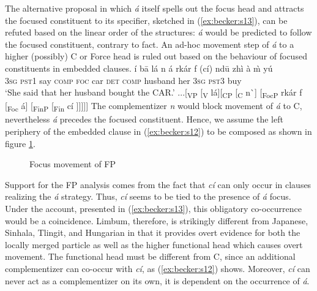 \documentclass[output=paper,
modfonts
]{langscibook}
\begin{document}
The alternative proposal in which {\em \'a} itself spells out the focus head and attracts the focused constituent to its specifier, sketched in (\ref{ex:becker:s13}), can be refuted based on the linear order of the structures: {\em \'a} would be predicted to follow the focused constituent, contrary to fact. An ad-hoc movement step of {\em \'a} to a higher (possibly) C or Force head is ruled out based on the behaviour of focused constituents in embedded clauses.
\ea
\ea \label{ex:becker:s12}
\gll \'i b\=a l\'a n \'a rk\'ar f (c\'i) {nd\=u} {zh\`i} \`a \`m y\'u \\  
     \textsc{3sg} \textsc{pst1} say \textsc{comp} \textsc{foc} car \textsc{det} \textsc{comp} {husband} her \textsc{3sg} \textsc{pst3} buy  \\ 
\glt `She said that her husband bought the CAR.'
\ex *...[\textsubscript{VP} [\textsubscript{V} l\'a][\textsubscript{CP} [\textsubscript{C} n\`\textepsilon] [\textsubscript{FocP} rk\'ar f [\textsubscript{Foc} \'a] [\textsubscript{FinP} [\textsubscript{Fin} c\'i ]]]]] \label{ex:becker:s13}
\z \z
\vspace{3mm}
\noindent The complementizer {\em n} would block movement of {\em \'a} to C, nevertheless {\em \'a} precedes the focused constituent. Hence, we assume the left periphery of the embedded clause in (\ref{ex:becker:s12}) to be composed as shown in figure \ref{fig:syntax:f1}.
\begin{figure}
\caption{Focus movement of FP}
\label{fig:syntax:f1}
\end{figure}
Support for the FP analysis comes from the fact that {\em c\'i} can only occur in clauses realizing the {\em \'a} strategy. Thus, {\em c\'i} seems to be tied to the presence of {\em \'a} focus. Under the account, presented in (\ref{ex:becker:s13}), this obligatory co-occurrence would be a coincidence. Limbum, therefore, is strikingly different from Japanese, Sinhala, Tlingit, and Hungarian in that it provides overt evidence for both the locally merged particle as well as the higher functional head which causes overt movement. The functional head must be different from C, since an additional complementizer can co-occur with {\em c\'i}, as (\ref{ex:becker:s12}) shows. Moreover, {\em c\'i} can never act as a complementizer on its own, it is dependent on the occurrence of {\em \'a}.
\end{document}

